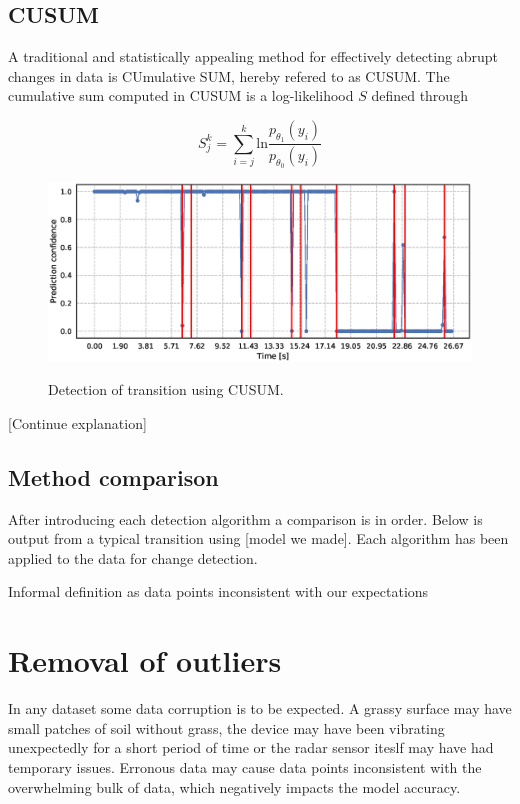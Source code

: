 \subsection{CUSUM}

A traditional and statistically appealing method for effectively detecting abrupt changes in data is CUmulative SUM, hereby refered to as CUSUM. The cumulative sum computed in CUSUM is a log-likelihood $S$ defined through

\begin{equation}
	S_j^k = \sum_{i=j}^k \text{ln}\frac{p_{\theta_1}(y_i)}{p_{\theta_0}(y_i)}
\end{equation}

\begin{figure}
	\includegraphics[scale=0.5]{figs_temp/detect_cusum}
	\label{fig:detect_cusum}
	\caption{Detection of transition using CUSUM.}
\end{figure}

[Continue explanation]


\citep{basseville_nikiforov_1993}




\subsection{Method comparison}

After introducing each detection algorithm a comparison is in order. Below is output from a typical transition using [model we made]. Each algorithm has been applied to the data for change detection.


Informal definition as data points inconsistent with our expectations

\section{Removal of outliers}

In any dataset some data corruption is to be expected. A grassy surface may have small patches of soil without grass, the device may have been vibrating unexpectedly for a short period of time or the radar sensor iteslf may have had temporary issues. Erronous data may cause data points inconsistent with the overwhelming bulk of data, which negatively impacts the model accuracy. 

